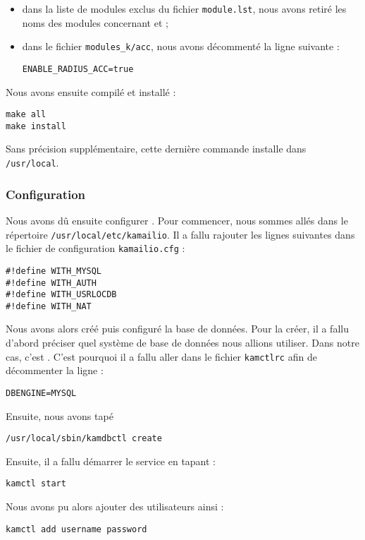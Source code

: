 \begin{itemize}
	\item{dans la liste de modules exclus du fichier \texttt{module.lst}, nous avons retiré les noms des modules concernant {\my} et {\rad}} ;
	\item{dans le fichier \texttt{modules\_k/acc}, nous avons décommenté la ligne suivante :
\begin{verbatim}
ENABLE_RADIUS_ACC=true
\end{verbatim}}
\end{itemize}

Nous avons ensuite compilé et installé {\kam} :

\begin{verbatim}
make all
make install
\end{verbatim}

Sans précision supplémentaire, cette dernière commande installe {\kam} dans \texttt{/usr/local}.

\subsubsection{Configuration}

Nous avons dû ensuite configurer {\kam}. Pour commencer, nous sommes allés dans le répertoire \texttt{/usr/local/etc/kamailio}. Il a fallu rajouter les lignes suivantes dans le fichier de configuration \texttt{kamailio.cfg} :

\begin{verbatim}
#!define WITH_MYSQL
#!define WITH_AUTH
#!define WITH_USRLOCDB
#!define WITH_NAT
\end{verbatim}

Nous avons alors créé puis configuré la base de données. Pour la créer, il a fallu d'abord préciser quel système de base de données nous allions utiliser. Dans notre cas, c'est \my. C'est pourquoi il a fallu aller dans le fichier \texttt{kamctlrc} afin de décommenter la ligne :

\begin{verbatim}
DBENGINE=MYSQL
\end{verbatim}

Ensuite, nous avons tapé 
\begin{verbatim}
/usr/local/sbin/kamdbctl create
\end{verbatim}

Ensuite, il a fallu démarrer le service en tapant :

\begin{verbatim}
kamctl start
\end{verbatim}

Nous avons pu alors ajouter des utilisateurs ainsi :

\begin{verbatim}
kamctl add username password
\end{verbatim}
